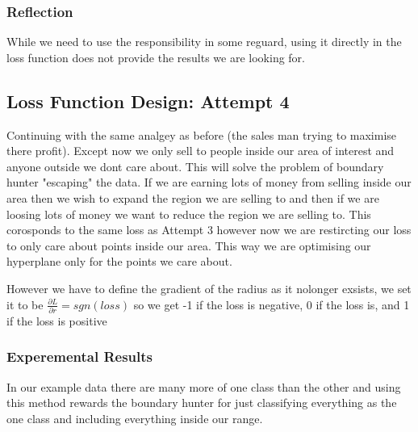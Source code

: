 \documentclass{article}
\begin{document}
\subsubsection{Reflection}
While we need to use the responsibility in some reguard, using it directly in the loss function does not provide the results we are looking for.


\subsection{Loss Function Design: Attempt 4}
Continuing with the same analgey as before (the sales man trying to maximise there profit). Except now we only sell to people inside our area of interest and anyone outside we dont care about. This will solve the problem of boundary hunter "escaping" the data. If we are earning lots of money from selling inside our area then we wish to expand the region we are selling to and then if we are loosing lots of money we want to reduce the region we are selling to. This corosponds to the same loss as Attempt 3 however now we are restircting our loss to only care about points inside our area. This way we are optimising our hyperplane only for the points we care about.

However we have to define the gradient of the radius as it nolonger exsists, we set it to be $\frac{\partial L}{\partial r} = sgn(loss)$  so we get -1 if the loss is negative, 0 if the loss is, and 1 if the loss is positive

\subsubsection{Experemental Results}
In our example data there are many more of one class than the other and using this method rewards the boundary hunter for just classifying everything as the one class and including everything inside our range.
\end{document}
